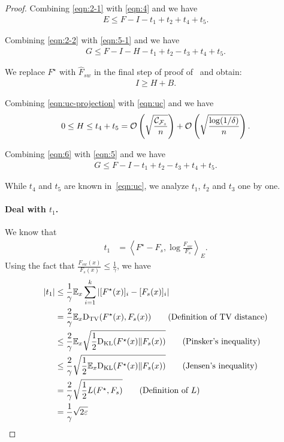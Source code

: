 \begin{proof}
Combining \eqref{eqn:2-1} with \eqref{eqn:4} and we have
\begin{align}
    E \le F - I - t_1 + t_2 + t_4 + t_5. \label{eqn:5-1}
\end{align}

Combining \eqref{eqn:2-2} with \eqref{eqn:5-1} and we have
\begin{align}
    G \le F - I - H - t_1 + t_2 - t_3 + t_4 + t_5. \label{eqn:5}
\end{align}

We replace $F^\star$ with $\hat{F}_{sw}$ in the final step of proof of~ and obtain:
\begin{align}
    I \ge H + B. \label{eqn:uc-projection}
\end{align}

Combining \eqref{eqn:uc-projection} with \eqref{eqn:uc} and we have
\begin{align}
    0 \le H \le t_4 + t_5 = \mathcal{O}\left(\sqrt{\frac{\mathcal{C}_{\mathcal{F}_s}}{n}}\right) + \mathcal{O}\left(\sqrt{\frac{\log(1/\delta)}{n}}\right). \label{eqn:6}
\end{align}

Combining \eqref{eqn:6} with \eqref{eqn:5} and we have
\begin{align}
    G \le F - I - t_1 + t_2 - t_3 + t_4 + t_5. \label{eqn:7}
\end{align}

While $t_4$ and $t_5$ are known in~\eqref{eqn:uc}, we analyze $t_1$, $t_2$ and $t_3$ one by one.






\paragraph{Deal with $t_1$.}

We know that
\begin{align}
    t_1 & = \left \langle F^\star-F_s, \log \frac{F_{sw}}{F_s} \right \rangle_E. \nonumber
\end{align}
Using the fact that $\frac{F_{sw}(x)}{F_s(x)} \le \frac{1}{\gamma}$, we have
\begin{align} \label{def_t_1_ineq}
    |t_1| & \le \frac{1}{\gamma} \expect_x \sum_{i=1}^k \left| [F^\star(x)]_i - [F_s(x)]_i \right| \nonumber
    \\ & = \frac{2}{\gamma} \expect_x \tv(F^\star(x), F_s(x)) \tag{Definition of TV distance} \nonumber
    \\ & \le \frac{2}{\gamma} \expect_x \sqrt{\frac{1}{2}\mathrm{D}_{\mathrm{KL}}(F^\star(x) \| F_s(x))} \tag{Pinsker's inequality} \nonumber
    \\ & \le \frac{2}{\gamma} \sqrt{\frac{1}{2} \expect_x \mathrm{D}_{\mathrm{KL}}(F^\star(x) \| F_s(x))} \tag{Jensen’s inequality} \nonumber
    \\ & = \frac{2}{\gamma} \sqrt{\frac{1}{2} \dist(F^\star, F_s)} \tag{Definition of $\dist$} \nonumber
    \\ & = \frac{1}{\gamma} \sqrt{2 \varepsilon}
\end{align}


\end{proof}
